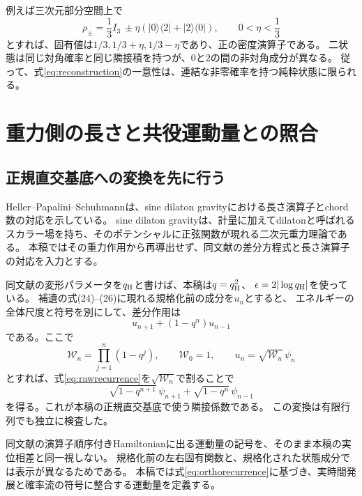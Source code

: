 \documentclass[a4paper,11pt]{ltjsarticle}
\numberwithin{equation}{section}
\newcommand{\ket}[1]{\lvert #1\rangle}
\newcommand{\bra}[1]{\langle #1\rvert}
\begin{document}
例えば三次元部分空間上で
\begin{equation}
 \rho_\pm=\frac13 I_3\ \pm\eta(\ket0\bra2+\ket2\bra0),
 \qquad 0<\eta<\frac13
 \label{eq:mixed}
\end{equation}
とすれば、固有値は$1/3,1/3+\eta,1/3-\eta$であり、正の密度演算子である。
二状態は同じ対角確率と同じ隣接積を持つが、$0$と$2$の間の非対角成分が異なる。
従って、式\eqref{eq:reconstruction}の一意性は、連結な非零確率を持つ純粋状態に限られる。

\section{重力側の長さと共役運動量との照合}
\subsection{正規直交基底への変換を先に行う}
Heller--Papalini--Schuhmannは、sine dilaton gravityにおける長さ演算子とchord数の対応を示している\cite{Heller}。
sine dilaton gravityは、計量に加えてdilatonと呼ばれるスカラー場を持ち、そのポテンシャルに正弦関数が現れる二次元重力理論である。
本稿ではその重力作用から再導出せず、同文献の差分方程式と長さ演算子の対応を入力とする。

同文献の変形パラメータを$q_{\rm H}$と書けば、本稿は$q=q_{\rm H}^2$、
$\epsilon=2|\log q_{\rm H}|$を使っている。
補遺の式(24)--(26)に現れる規格化前の成分を$u_n$とすると、
エネルギーの全体尺度と符号を別にして、差分作用は
\begin{equation}
 u_{n+1}+(1-q^n)u_{n-1}
 \label{eq:rawrecurrence}
\end{equation}
である。ここで
\begin{equation}
 \mathcal W_n=\prod_{j=1}^n(1-q^j),\qquad \mathcal W_0=1,\qquad
 u_n=\sqrt{\mathcal W_n}\,\psi_n
 \label{eq:normalization}
\end{equation}
とすれば、式\eqref{eq:rawrecurrence}を$\sqrt{\mathcal W_n}$で割ることで
\begin{equation}
 \sqrt{1-q^{n+1}}\,\psi_{n+1}+\sqrt{1-q^n}\,\psi_{n-1}
 \label{eq:orthorecurrence}
\end{equation}
を得る。これが本稿の正規直交基底で使う隣接係数である。
この変換は有限行列でも独立に検査した。

同文献の演算子順序付きHamiltonianに出る運動量の記号を、そのまま本稿の実位相差と同一視しない。
規格化前の左右固有関数と、規格化された状態成分では表示が異なるためである。
本稿では式\eqref{eq:orthorecurrence}に基づき、実時間発展と確率流の符号に整合する運動量を定義する。
\end{document}
